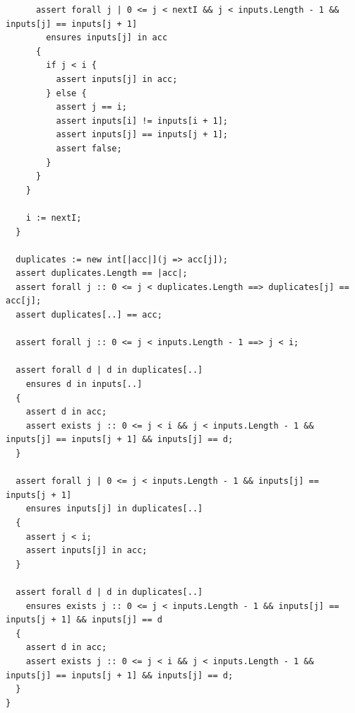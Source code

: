 \documentclass{article}
\begin{document}
\begin{lstlisting}
      assert forall j | 0 <= j < nextI && j < inputs.Length - 1 && inputs[j] == inputs[j + 1]
        ensures inputs[j] in acc
      {
        if j < i {
          assert inputs[j] in acc;
        } else {
          assert j == i;
          assert inputs[i] != inputs[i + 1];
          assert inputs[j] == inputs[j + 1];
          assert false;
        }
      }
    }

    i := nextI;
  }

  duplicates := new int[|acc|](j => acc[j]);
  assert duplicates.Length == |acc|;
  assert forall j :: 0 <= j < duplicates.Length ==> duplicates[j] == acc[j];
  assert duplicates[..] == acc;

  assert forall j :: 0 <= j < inputs.Length - 1 ==> j < i;

  assert forall d | d in duplicates[..]
    ensures d in inputs[..]
  {
    assert d in acc;
    assert exists j :: 0 <= j < i && j < inputs.Length - 1 && inputs[j] == inputs[j + 1] && inputs[j] == d;
  }

  assert forall j | 0 <= j < inputs.Length - 1 && inputs[j] == inputs[j + 1]
    ensures inputs[j] in duplicates[..]
  {
    assert j < i;
    assert inputs[j] in acc;
  }

  assert forall d | d in duplicates[..]
    ensures exists j :: 0 <= j < inputs.Length - 1 && inputs[j] == inputs[j + 1] && inputs[j] == d
  {
    assert d in acc;
    assert exists j :: 0 <= j < i && j < inputs.Length - 1 && inputs[j] == inputs[j + 1] && inputs[j] == d;
  }
}
\end{lstlisting}
\end{document}
